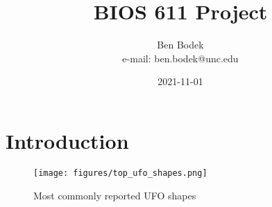 \documentclass{article}
\begin{document}
\title{BIOS 611 Project}
\author{Ben Bodek \\ e-mail: ben.bodek@unc.edu}
\date{2021-11-01}
\maketitle

\section{Introduction}
\begin{figure}
  \centering
  \texttt{[image: figures/top\_ufo\_shapes.png]}
  \caption{Most commonly reported UFO shapes}
  \label{fig:ufo_shapes}
\end{figure}
\end{document}
